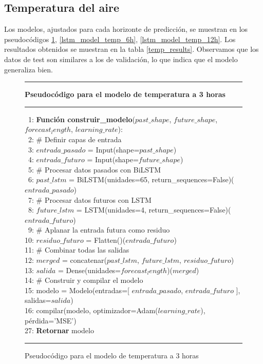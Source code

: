 \subsection{Temperatura del aire}
Los modelos, ajustados para cada horizonte de predicción, se muestran en los pseudocódigos \ref{lstm_model_temp_3h}, \ref{lstm_model_temp_6h}, \ref{lstm_model_temp_12h}.
Los resultados obtenidos se muestran en la tabla \ref{temp_results}. Observamos que los datos de test son similares a los de validación, 
lo que indica que el modelo generaliza bien.

\begin{figure}[H]
{\small
\hrule
{\bf\small Pseudocódigo para el modelo de temperatura a 3 horas}
\hrule
\begin{center}
\begin{tabbing}
\ 1: {\bf Fun}\={\bf ción construir\_modelo}($past\_shape$, $future\_shape$, $forecast_length$, $learning\_rate$): \\
\ 2: \> \# Definir capas de entrada \\
\ 3: \> $entrada\_pasado$ = Input(shape=$past\_shape$) \\
\ 4: \> $entrada\_futuro$ = Input(shape=$future\_shape$) \\
\ 5: \> \# Procesar datos pasados con BiLSTM \\
\ 6: \> $past\_lstm$ = BiLSTM(unidades=65, return\_sequences=False)($entrada\_pasado$) \\
\ 7: \> \# Procesar datos futuros con LSTM \\
\ 8: \> $future\_lstm$ = LSTM(unidades=4, return\_sequences=False)($entrada\_futuro$) \\
\ 9: \> \# Aplanar la entrada futura como residuo \\
10: \> $residuo\_futuro$ = Flatten()($entrada\_futuro$) \\
11: \> \# Combinar todas las salidas \\
12: \> $merged$ = concatenar($past\_lstm$, $future\_lstm$, $residuo\_futuro$) \\
13: \> $salida$ = Dense(unidades=$forecast_length$)($merged$) \\
14: \> \# Construir y compilar el modelo \\
15: \> modelo = Modelo(entradas=[ $entrada\_pasado$, $entrada\_futuro$ ], salidas=$salida$) \\
16: \> compilar(modelo, optimizador=Adam($learning\_rate$), pérdida='MSE') \\
27: \> {\bf Retornar} modelo \\
\end{tabbing}
\end{center}
}
\hrule
\caption{Pseudocódigo para el modelo de temperatura a 3 horas}
\label{lstm_model_temp_3h}
\end{figure}

